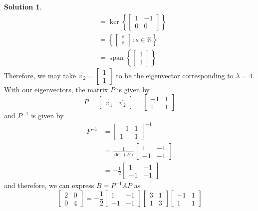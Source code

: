 \documentclass[11pt]{article}
\theoremstyle{definition}\newtheorem{definition}{Definition}
\theoremstyle{definition}\newtheorem{question}{Question}
\theoremstyle{definition}\newtheorem*{solution}{Solution}
\theoremstyle{definition}\newtheorem{example}{Example}
\theoremstyle{definition}\newtheorem{notation}{Notation}
\theoremstyle{theorem}\newtheorem{theorem}{Theorem}
\theoremstyle{theorem}\newtheorem{corollary}{Corollary}
\theoremstyle{theorem}\newtheorem{lemma}{Lemma}
\theoremstyle{theorem}\newtheorem{proposition}{Proposition}
\newcommand{\R}{\mathbb{R}}
\DeclareMathOperator{\Span}{span}
\begin{document}
\begin{solution}
\begin{align*}
        &= \ker\left\{\begin{bmatrix} 1 & -1 \\ 0 & 0 \end{bmatrix}\right\} \\
        &= \left\{\begin{bmatrix} s \\ s \end{bmatrix} : s \in \R\right\} \\
        &= \Span\left\{\begin{bmatrix} 1 \\ 1 \end{bmatrix}\right\}
    \end{align*}
    Therefore, we may take $\vec{v}_2 = \begin{bmatrix} 1 \\ 1 \end{bmatrix}$ to be the eigenvector corresponding to $\lambda = 4$. With our eigenvectors, the matrix $P$ is given by
    \begin{equation*}
        P = \begin{bmatrix} \vec{v}_1 & \vec{v}_2 \end{bmatrix} = \begin{bmatrix} -1 & 1 \\ 1 & 1 \end{bmatrix}
    \end{equation*}
    and $P^{-1}$ is given by
    \begin{align*}
        P^{-1} &= \begin{bmatrix} -1 & 1 \\ 1 & 1 \end{bmatrix}^{-1} \\
        &= \frac{1}{\det(P)} \begin{bmatrix} 1 & -1 \\ -1 & -1 \end{bmatrix} \\
        &= -\frac{1}{2} \begin{bmatrix} 1 & -1 \\ -1 & -1 \end{bmatrix}
    \end{align*}
    and therefore, we can express $B = P^{-1}AP$ as
    \begin{equation*}
        \begin{bmatrix} 2 & 0 \\ 0 & 4 \end{bmatrix} = -\frac{1}{2}\begin{bmatrix} 1 & -1 \\ -1 & -1 \end{bmatrix} \begin{bmatrix} 3 & 1 \\ 1 & 3 \end{bmatrix} \begin{bmatrix} -1 & 1 \\ 1 & 1 \end{bmatrix}

\end{equation*}
\end{solution}
\end{document}
